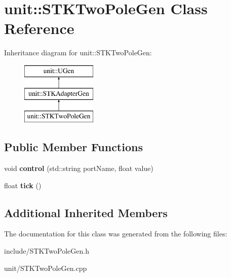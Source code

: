 \hypertarget{classunit_1_1STKTwoPoleGen}{}\section{unit\+:\+:S\+T\+K\+Two\+Pole\+Gen Class Reference}
\label{classunit_1_1STKTwoPoleGen}
Inheritance diagram for unit\+:\+:S\+T\+K\+Two\+Pole\+Gen\+:\begin{figure}[H]
\begin{center}
\leavevmode
\includegraphics[height=3.000000cm]{classunit_1_1STKTwoPoleGen}
\end{center}
\end{figure}
\subsection*{Public Member Functions}
\begin{DoxyCompactItemize}
\item 
void {\bfseries control} (std\+::string port\+Name, float value)\hypertarget{classunit_1_1STKTwoPoleGen_a71b904b3c03c69f5fb25bbf2449fb802}{}\label{classunit_1_1STKTwoPoleGen_a71b904b3c03c69f5fb25bbf2449fb802}

\item 
float {\bfseries tick} ()\hypertarget{classunit_1_1STKTwoPoleGen_ade033932ab7e85b7f3d6a69461eef372}{}\label{classunit_1_1STKTwoPoleGen_ade033932ab7e85b7f3d6a69461eef372}

\end{DoxyCompactItemize}
\subsection*{Additional Inherited Members}


The documentation for this class was generated from the following files\+:\begin{DoxyCompactItemize}
\item 
include/S\+T\+K\+Two\+Pole\+Gen.\+h\item 
unit/S\+T\+K\+Two\+Pole\+Gen.\+cpp\end{DoxyCompactItemize}
